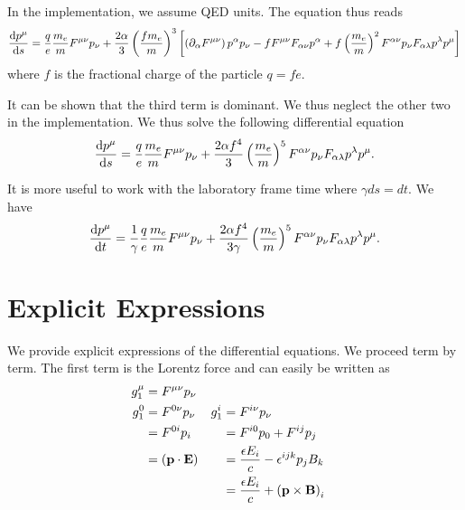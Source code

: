 \documentclass[10pt,letterpaper,extrafontsizes, onecolumn,openright]{memoir}
\begin{document}
In the implementation, we assume QED units. The equation thus reads
  \begin{equation}
    \dv{p^\mu}{s}=\frac{q}{e}\frac{m_e}{m}F^{\mu\nu}p_\nu
                   +\frac{2\alpha}{3}\left(\frac{fm_e}{m}\right)^3
                      \left[
                        \left(\partial_\alpha F^{\mu\nu}\right)p^\alpha p_\nu
                      - fF^{\mu\nu}F_{\alpha\nu}p^\alpha
                      + f\left(\frac{m_e}{m}\right)^2 F^{\alpha\nu}p_\nu F_{\alpha\lambda}p^\lambda p^\mu
                      \right]
\end{equation}
where $f$ is the fractional charge of the particle $q=fe$.

It can be shown \cite{} that the third term is dominant. We thus neglect the other
two in the implementation. We thus solve the following differential equation
  \begin{equation}
    \dv{p^\mu}{s}=\frac{q}{e}\frac{m_e}{m}F^{\mu\nu}p_\nu
                   +\frac{2\alpha f^4}{3}\left(\frac{m_e}{m}\right)^5
                   F^{\alpha\nu}p_\nu F_{\alpha\lambda}p^\lambda p^\mu.
  \end{equation}

It is more useful to work with the laboratory frame time where $\gamma ds = dt$.
We have
  \begin{equation}
    \dv{p^\mu}{t}=\frac{1}{\gamma}\frac{q}{e}\frac{m_e}{m}F^{\mu\nu}p_\nu
                   +\frac{2\alpha f^4}{3\gamma}\left(\frac{m_e}{m}\right)^5
                   F^{\alpha\nu}p_\nu F_{\alpha\lambda}p^\lambda p^\mu.
  \end{equation}

\section{Explicit Expressions}
We provide explicit expressions of the differential equations. We proceed term
by term. The first term is the Lorentz force and can easily be written as
  \begin{align*}
    g_1^\mu &= F^{\mu\nu}p_\nu                  &  \\
    g_1^0   &= F^{0\nu}p_\nu                    & g_1^i   &= F^{i\nu}p_\nu    \\
            &= F^{0i}p_i                       &         &= F^{i0}p_0+F^{ij}p_j        \\
            &= \left(\vb{p}\cdot\vb{E}\right)   &         &= \frac{\epsilon E_i}{c}-\epsilon^{ijk}p_jB_k \\
            &                                   &         &= \frac{\epsilon E_i}{c}+\left(\vb{p}\times\vb{B}\right)_i
  \end{align*}
\end{document}

